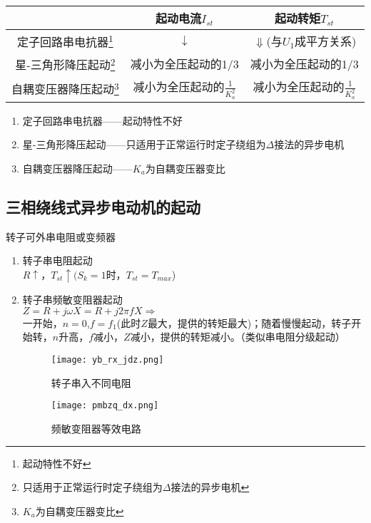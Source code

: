 \documentclass[blue]{elegantnote}
\begin{document}
\begin{table}
	\centering
	\begin{tabular}{|c|c|c|}
		\hline 
		&   起动电流$I_{st}$  & 起动转矩$T_{st}$                  \\ \hline
		定子回路串电抗器\footnote{起动特性不好}  &   $\downarrow$      &  $\Downarrow$(与$U_1$成平方关系)  \\ \hline
		星-三角形降压起动\footnote{ 只适用于正常运行时定子绕组为$\Delta$接法的异步电机 } & 减小为全压起动的1/3 & 减小为全压起动的1/3 \\ \hline
		自耦变压器降压起动\footnote{ $K_a$为自耦变压器变比} & 减小为全压起动的$\frac{1}{K_a^{2}}$  &  减小为全压起动的$\frac{1}{K_a^{2}}$  \\ \hline
	\end{tabular}
\end{table}
\begin{note}
	\begin{enumerate}
		\item 定子回路串电抗器——起动特性不好
		\item 星-三角形降压起动——只适用于正常运行时定子绕组为$\Delta$接法的异步电机 
		\item 自耦变压器降压起动——$K_a$为自耦变压器变比
	\end{enumerate}
\end{note}

\subsection{三相绕线式异步电动机的起动}
{\color{thid} 转子可外串电阻或变频器}
\begin{enumerate}
	\item 转子串电阻起动\\
	$R\uparrow$，$T_{st}\uparrow(S_k=1$时，$T_{st}=T_{max}$)
	\item 转子串频敏变阻器起动\\
	$Z=R+j\omega X=R+j2\pi fX\Rightarrow$\\
	一开始，$n=0$,$f=f_1$(此时$Z$最大，提供的转矩最大)；随着慢慢起动，转子开始转，$n$升高，$f$减小，$Z$减小，提供的转矩减小。{\color{blue}（类似串电阻分级起动）}
	\begin{figure}[!hbtp]
		\centering
		\begin{minipage}[t]{0.48\textwidth}
			\centering
			\texttt{[image: yb\_rx\_jdz.png]}
			\caption{转子串入不同电阻\label{figur:yb_rx_jdz}}
		\end{minipage}
		\begin{minipage}[t]{0.48\textwidth}
			\centering
			\texttt{[image: pmbzq\_dx.png]}
			\caption{频敏变阻器等效电路\label{figur:pmbzq_dx}}
		\end{minipage}
	\end{figure}
\end{enumerate}
\end{document}
